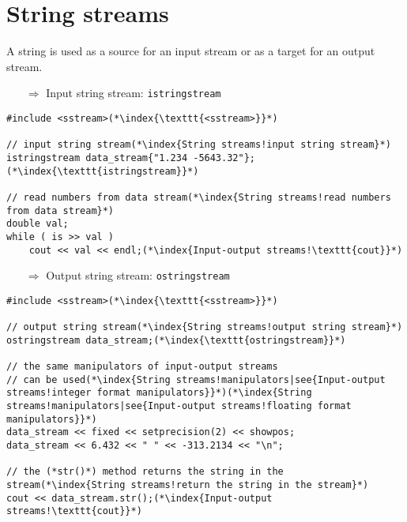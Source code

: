 \documentclass[10pt]{article}
\begin{document}
\section{String streams}
\small
A string is used as a source for an input stream or as a target for an output stream. \\
\begin{enumerate}
\item[$\Rightarrow$] Input string stream: \texttt{istringstream}
\end{enumerate}
\begin{lstlisting}
#include <sstream>(*\index{\texttt{<sstream>}}*)

// input string stream(*\index{String streams!input string stream}*)
istringstream data_stream{"1.234 -5643.32"};(*\index{\texttt{istringstream}}*)

// read numbers from data stream(*\index{String streams!read numbers from data stream}*)
double val;
while ( is >> val )
    cout << val << endl;(*\index{Input-output streams!\texttt{cout}}*)
\end{lstlisting}
\begin{enumerate}
\item[$\Rightarrow$] Output string stream: \texttt{ostringstream}
\end{enumerate}
\begin{lstlisting}
#include <sstream>(*\index{\texttt{<sstream>}}*)

// output string stream(*\index{String streams!output string stream}*)
ostringstream data_stream;(*\index{\texttt{ostringstream}}*)

// the same manipulators of input-output streams
// can be used(*\index{String streams!manipulators|see{Input-output streams!integer format manipulators}}*)(*\index{String streams!manipulators|see{Input-output streams!floating format manipulators}}*)
data_stream << fixed << setprecision(2) << showpos;
data_stream << 6.432 << " " << -313.2134 << "\n";

// the (*str()*) method returns the string in the stream(*\index{String streams!return the string in the stream}*)
cout << data_stream.str();(*\index{Input-output streams!\texttt{cout}}*)
\end{lstlisting}
%
%
\end{document}
